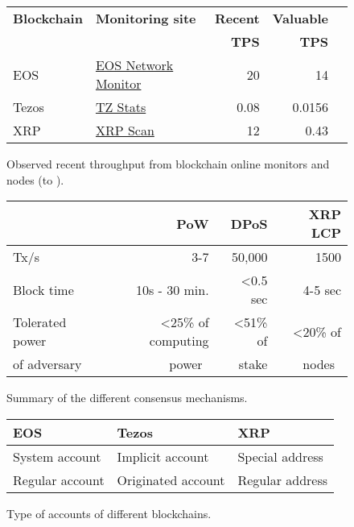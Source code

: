 

\begin{figure}[tb]
\setlength{\tabcolsep}{1.3pt}
\centering
\begin{tabular}{llrrr}
\toprule
\bf Blockchain & \bf Monitoring site & \bf Recent & \bf Valuable\\ 
 &                     & \bf TPS    & \bf TPS\\
\midrule 
EOS     &  \href{https://eosnetworkmonitor.io/}{EOS Network Monitor} & 20 & 14 \\
Tezos   &  \href{https://tzstats.com/}{TZ Stats} & 0.08 & 0.0156 \\
XRP     & \href{https://xrpscan.com/metrics}{XRP Scan} & 12 & 0.43 \\
\bottomrule
\end{tabular}
\caption{Observed recent throughput from blockchain online  monitors and nodes (\startdate to \finishdate).}
\label{fig:observed-tps}
\end{figure}




\begin{figure}[bt]
\footnotesize
\centering
\setlength{\tabcolsep}{4pt}
\begin{tabular}{l r r r}
\toprule
      & \textbf{PoW}       & \textbf{DPoS} & \textbf{XRP LCP} \\
\midrule
Tx/s               & 3-7        & 50,000     & 1500     \\
Block time & 10s - 30 min. & \textless 0.5 sec     & 4-5 sec \\ 
Tolerated power & \textless 25\% of computing & \textless 51\% of & \textless 20\% of \\
of adversary &  power~\cite{pow_selfish_mining} & stake &  nodes~\cite{Chase2018}\\
\bottomrule
\end{tabular}
\caption{Summary of the different consensus mechanisms.}
\label{tab:consensus-mechanisms}
\end{figure}






\begin{figure}[tb]
    \centering
    \begin{tabular}{lll}
    \toprule
        \bf EOS & \bf Tezos & \bf XRP\\
    \midrule
        System account   & Implicit account   & Special address\\
        Regular account  & Originated account & Regular address\\
    \bottomrule
    \end{tabular}
    \caption{Type of accounts of different blockchains.}
    \label{tab:account-types}
\end{figure}


